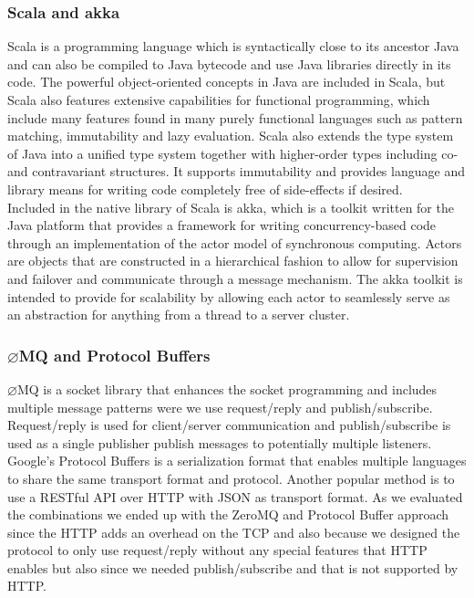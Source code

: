 \subsubsection{Scala and akka}
Scala\cite{ref_scala} is a programming language which is syntactically close to its ancestor Java and can also be compiled to Java bytecode and use Java libraries directly in its code. The powerful object-oriented concepts in Java are included in Scala, but Scala also features extensive capabilities for functional programming, which include many features found in many purely functional languages such as pattern matching, immutability and lazy evaluation. Scala also extends the type system of Java into a unified type system together with higher-order types including co- and contravariant structures. It supports immutability and provides language and library means for writing code completely free of side-effects if desired.\\
Included in the native library of Scala is akka\cite{ref_akka}, which is a toolkit written for the Java platform that provides a framework for writing concurrency-based code through an implementation of the actor model of synchronous computing. Actors are objects that are constructed in a hierarchical fashion to allow for supervision and failover and communicate through a message mechanism. The akka toolkit is intended to provide for scalability by allowing each actor to seamlessly serve as an abstraction for anything from a thread to a server cluster.
\subsubsection{$\varnothing$MQ and Protocol Buffers\label{zmq_protobuf}}
$\varnothing$MQ\cite{ref_zmq} is a socket library that enhances the socket programming and includes multiple message patterns were we use request/reply and publish/subscribe. Request/reply is used for client/server communication and publish/subscribe is used as a single publisher publish messages to potentially multiple listeners. Google's Protocol Buffers\cite{ref_protobuf} is a serialization format that enables multiple languages to share the same transport format and protocol. Another popular method is to use a RESTful API over HTTP with JSON as transport format. As we evaluated the combinations we ended up with the ZeroMQ and Protocol Buffer approach since the HTTP adds an overhead on the TCP and also because we designed the protocol to only use request/reply without any special features that HTTP enables but also since we needed publish/subscribe and that is not supported by HTTP.
